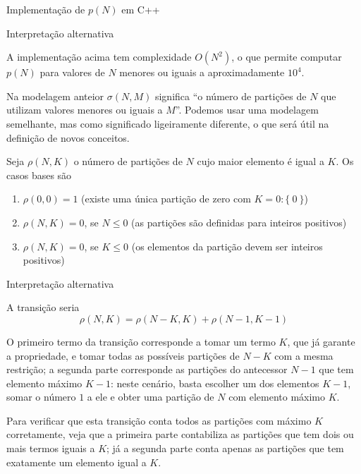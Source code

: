 \begin{frame}[fragile]{Implementação de $p(N)$ em C++}


\end{frame}

\begin{frame}[fragile]{Interpretação alternativa}

A implementação acima tem complexidade $O(N^2)$, o que permite computar $p(N)$ para valores de
$N$ menores ou iguais a aproximadamente $10^4$.

Na modelagem anteior $\sigma(N, M)$ significa ``o número de partições de $N$ que utilizam
valores menores ou iguais a $M$''. Podemos usar uma modelagem semelhante, mas como significado
ligeiramente diferente, o que será útil na definição de novos conceitos.

Seja $\rho(N, K)$ o número de partições de $N$ cujo maior elemento é igual a $K$. Os casos bases 
são
\begin{enumerate}
    \item $\rho(0, 0) = 1$ (existe uma única partição de zero com $K = 0: \{\ 0\ \}$)
    \item $\rho(N, K) = 0$, se $N \leq 0$ (as partições são definidas para inteiros positivos)
    \item $\rho(N, K) = 0$, se $K \leq 0$ (os elementos da partição devem ser inteiros positivos)
\end{enumerate}

\end{frame}

\begin{frame}[fragile]{Interpretação alternativa}

A transição seria
\[
        \rho(N, K) = \rho(N - K, K) + \rho(N - 1, K - 1)
\]

O primeiro termo da transição corresponde a tomar um termo $K$, que já garante a propriedade,
e tomar todas as possíveis partições de $N - K$ com a mesma restrição; a segunda parte 
corresponde as partições do antecessor $N - 1$ que tem elemento máximo $K - 1$: neste cenário,
basta escolher um dos elementos $K - 1$, somar o número $1$ a ele e obter uma partição de $N$ com elemento
máximo $K$.

Para verificar que esta transição conta todos as partições com máximo $K$ corretamente, veja que
a primeira parte contabiliza as partições que tem dois
ou mais termos iguais a $K$; já a segunda parte conta apenas as partições que tem exatamente
um elemento igual a $K$.

\end{frame}

